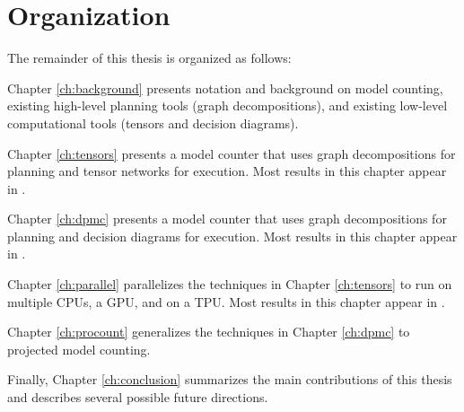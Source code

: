 \section{Organization}
The remainder of this thesis is organized as follows:

Chapter \ref{ch:background} presents notation and background on model counting, existing high-level planning tools (graph decompositions), and existing low-level computational tools (tensors and decision diagrams). 

Chapter \ref{ch:tensors} presents a model counter  that uses graph decompositions for planning and tensor networks for execution. Most results in this chapter appear in \cite{DDV19}.

Chapter \ref{ch:dpmc} presents a model counter  that uses graph decompositions for planning and decision diagrams for execution. Most results in this chapter appear in \cite{dudek2020dpmc}.

Chapter \ref{ch:parallel} parallelizes the techniques in Chapter \ref{ch:tensors} to run on multiple CPUs, a GPU, and on a TPU. Most results in this chapter appear in \cite{dudek2020parallel}.

Chapter \ref{ch:procount} generalizes the techniques in Chapter \ref{ch:dpmc} to projected model counting.

Finally, Chapter \ref{ch:conclusion} summarizes the main contributions of this thesis and describes several possible future directions.